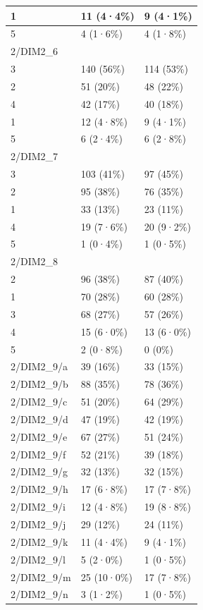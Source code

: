 \documentclass[
]{book}
\begin{document}
\begin{tabular}{l|l|l}
1 & 11 (4·4\%) & 9 (4·1\%)\\
\hline
5 & 4 (1·6\%) & 4 (1·8\%)\\
\hline
2/DIM2\_6 &  & \\
\hline
3 & 140 (56\%) & 114 (53\%)\\
\hline
2 & 51 (20\%) & 48 (22\%)\\
\hline
4 & 42 (17\%) & 40 (18\%)\\
\hline
1 & 12 (4·8\%) & 9 (4·1\%)\\
\hline
5 & 6 (2·4\%) & 6 (2·8\%)\\
\hline
2/DIM2\_7 &  & \\
\hline
3 & 103 (41\%) & 97 (45\%)\\
\hline
2 & 95 (38\%) & 76 (35\%)\\
\hline
1 & 33 (13\%) & 23 (11\%)\\
\hline
4 & 19 (7·6\%) & 20 (9·2\%)\\
\hline
5 & 1 (0·4\%) & 1 (0·5\%)\\
\hline
2/DIM2\_8 &  & \\
\hline
2 & 96 (38\%) & 87 (40\%)\\
\hline
1 & 70 (28\%) & 60 (28\%)\\
\hline
3 & 68 (27\%) & 57 (26\%)\\
\hline
4 & 15 (6·0\%) & 13 (6·0\%)\\
\hline
5 & 2 (0·8\%) & 0 (0\%)\\
\hline
2/DIM2\_9/a & 39 (16\%) & 33 (15\%)\\
\hline
2/DIM2\_9/b & 88 (35\%) & 78 (36\%)\\
\hline
2/DIM2\_9/c & 51 (20\%) & 64 (29\%)\\
\hline
2/DIM2\_9/d & 47 (19\%) & 42 (19\%)\\
\hline
2/DIM2\_9/e & 67 (27\%) & 51 (24\%)\\
\hline
2/DIM2\_9/f & 52 (21\%) & 39 (18\%)\\
\hline
2/DIM2\_9/g & 32 (13\%) & 32 (15\%)\\
\hline
2/DIM2\_9/h & 17 (6·8\%) & 17 (7·8\%)\\
\hline
2/DIM2\_9/i & 12 (4·8\%) & 19 (8·8\%)\\
\hline
2/DIM2\_9/j & 29 (12\%) & 24 (11\%)\\
\hline
2/DIM2\_9/k & 11 (4·4\%) & 9 (4·1\%)\\
\hline
2/DIM2\_9/l & 5 (2·0\%) & 1 (0·5\%)\\
\hline
2/DIM2\_9/m & 25 (10·0\%) & 17 (7·8\%)\\
\hline
2/DIM2\_9/n & 3 (1·2\%) & 1 (0·5\%)\\

\end{tabular}
\end{document}

